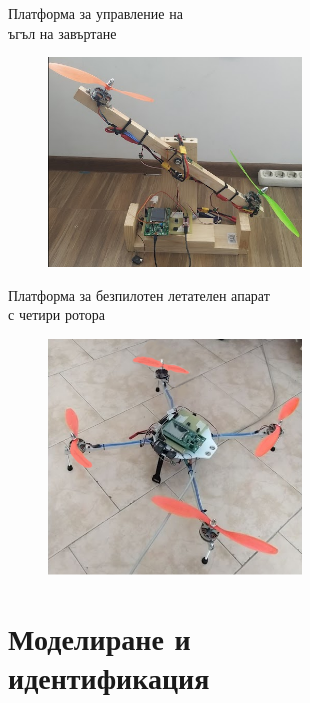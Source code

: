 \documentclass{beamer}
\begin{document}
\begin{frame}{Платформа за управление на \\ъгъл на завъртане}
	\pause
	\begin{figure}[htpb!]
		\centering
		\includegraphics[width=0.6\textwidth]{Images/balance_construction.png}
	\end{figure}

\end{frame}

\begin{frame}{Платформа за безпилотен летателен апарат \\с четири ротора }
	\pause
	\begin{figure}[htpb!]
		\centering
		\includegraphics[width=0.6\textwidth]{Images/drone_construction.png}
	\end{figure}
\end{frame}




\section{Моделиране и \\идентификация}
\end{document}
